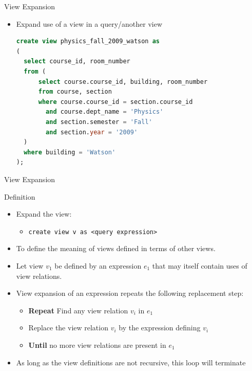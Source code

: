 \documentclass[aspectratio=169, xcolor=dvipsnames]{beamer}
\begin{document}
\begin{frame}[fragile]{View Expansion}
    \begin{itemize}
        \item Expand use of a view in a query/another view
        \begin{lstlisting}[language=SQL, basicstyle=\ttfamily\scriptsize]
create view physics_fall_2009_watson as 
( 
  select course_id, room_number 
  from (
      select course.course_id, building, room_number 
      from course, section 
      where course.course_id = section.course_id 
        and course.dept_name = 'Physics' 
        and section.semester = 'Fall' 
        and section.year = '2009'
  ) 
  where building = 'Watson'
);
        \end{lstlisting}
    \end{itemize}
\end{frame}

\begin{frame}{View Expansion}
    \begin{block}{Definition}
        \begin{itemize}[<+->]
            \item Expand the view:
            \begin{itemize}
                \item[$\triangleright$] \texttt{create view v as <query expression>}
            \end{itemize}
            \item To define the meaning of views defined in terms of other views.
            \item Let view $v_1$ be defined by an expression $e_1$ that may itself contain uses of view relations.
            \item View expansion of an expression repeats the following replacement step:
            \begin{itemize}
                \item[$\triangleright$] \textbf{Repeat} Find any view relation $v_i$ in $e_1$
                \item[$\triangleright$] Replace the view relation $v_i$ by the expression defining $v_i$
                \item[$\triangleright$] \textbf{Until} no more view relations are present in $e_1$
            \end{itemize}
            \item As long as the view definitions are not recursive, this loop will terminate
        \end{itemize}
    \end{block}
\end{frame}
\end{document}

